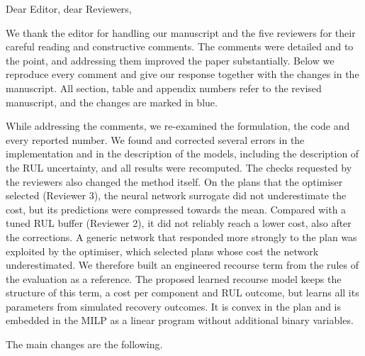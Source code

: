 \documentclass{article}
\begin{document}
Dear Editor, dear Reviewers,

We thank the editor for handling our manuscript and the five reviewers for their careful reading and constructive comments. The comments were detailed and to the point, and addressing them improved the paper substantially. Below we reproduce every comment and give our response together with the changes in the manuscript. All section, table and appendix numbers refer to the revised manuscript, and the changes are marked in blue.

While addressing the comments, we re-examined the formulation, the code and every reported number. We found and corrected several errors in the implementation and in the description of the models, including the description of the RUL uncertainty, and all results were recomputed. The checks requested by the reviewers also changed the method itself. On the plans that the optimiser selected (Reviewer 3), the neural network surrogate did not underestimate the cost, but its predictions were compressed towards the mean. Compared with a tuned RUL buffer (Reviewer 2), it did not reliably reach a lower cost, also after the corrections. A generic network that responded more strongly to the plan was exploited by the optimiser, which selected plans whose cost the network underestimated. We therefore built an engineered recourse term from the rules of the evaluation as a reference. The proposed learned recourse model keeps the structure of this term, a cost per component and RUL outcome, but learns all its parameters from simulated recovery outcomes. It is convex in the plan and is embedded in the MILP as a linear program without additional binary variables.

The main changes are the following.
\end{document}
